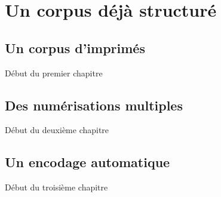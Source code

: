 \part{Un corpus déjà structuré}

\chapter{Un corpus d'imprimés}

Début du premier chapitre

\chapter{Des numérisations multiples}

Début du deuxième chapitre

\chapter{Un encodage automatique}

Début du troisième chapitre